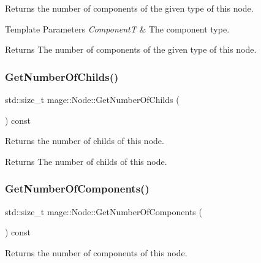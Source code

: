 Returns the number of components of the given type of this node.


\begin{DoxyTemplParams}{Template Parameters}
{\em ComponentT} & The component type. \\
\hline
\end{DoxyTemplParams}
\begin{DoxyReturn}{Returns}
The number of components of the given type of this node. 
\end{DoxyReturn}
\mbox{\label{classmage_1_1_node_a2903aa37bb4fabb3535f1a42495508a0}} 
\subsubsection{\texorpdfstring{Get\+Number\+Of\+Childs()}{GetNumberOfChilds()}}
{\footnotesize\ttfamily std\+::size\+\_\+t mage\+::\+Node\+::\+Get\+Number\+Of\+Childs (\begin{DoxyParamCaption}{ }\end{DoxyParamCaption}) const\hspace{0.3cm}{\ttfamily [noexcept]}}

Returns the number of childs of this node.

\begin{DoxyReturn}{Returns}
The number of childs of this node. 
\end{DoxyReturn}
\mbox{\label{classmage_1_1_node_a2ec7670be118f19aced512a528e6e7cb}} 
\subsubsection{\texorpdfstring{Get\+Number\+Of\+Components()}{GetNumberOfComponents()}}
{\footnotesize\ttfamily std\+::size\+\_\+t mage\+::\+Node\+::\+Get\+Number\+Of\+Components (\begin{DoxyParamCaption}{ }\end{DoxyParamCaption}) const\hspace{0.3cm}{\ttfamily [noexcept]}}

Returns the number of components of this node.

